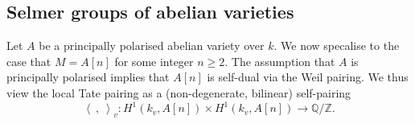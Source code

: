 \documentclass[10pt]{amsart}
\numberwithin{equation}{section}
\newtheorem{theorem}[equation]{Theorem}
\newtheorem{proposition}[equation]{Proposition}
\theoremstyle{remark}
\theoremstyle{definition}
\theoremstyle{definition}
\theoremstyle{definition}
\theoremstyle{definition}
\theoremstyle{definition}
\theoremstyle{definition}
\theoremstyle{definition}
\theoremstyle{definition}
\begin{document}
%
%
%
%

\subsection{Selmer groups of abelian varieties}

Let $A$ be a principally polarised abelian variety over $k$. We now specalise to the case that $M=A[n]$ for some integer $n\geq 2$. The assumption that $A$ is principally polarised implies that $A[n]$ is self-dual via the Weil pairing. We thus view the local Tate pairing as a (non-degenerate, bilinear) self-pairing
\[\left \langle ~,~\right \rangle_v:H^1(k_v,A[n])\times H^1(k_v,A[n])\to \mathbb{Q}/\mathbb{Z}.\]
\end{document}
